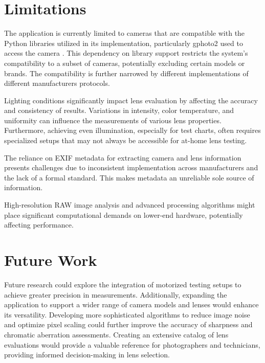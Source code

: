 \section{Limitations}
The application is currently limited to cameras that are compatible with the Python libraries utilized in its implementation, particularly gphoto2 used to access the camera \cite{gphoto2_compatible}. This dependency on library support restricts the system’s compatibility to a subset of cameras, potentially excluding certain models or brands. The compatibility is further narrowed by different implementations of different manufacturers protocols.

Lighting conditions significantly impact lens evaluation by affecting the accuracy and consistency of results. Variations in intensity, color temperature, and uniformity can influence the measurements of various lens properties. Furthermore, achieving even illumination, especially for test charts, often requires specialized setups that may not always be accessible for at-home lens testing.

The reliance on EXIF metadata for extracting camera and lens information presents challenges due to inconsistent implementation across manufacturers and the lack of a formal standard. This makes metadata an unreliable sole source of information.

High-resolution RAW image analysis and advanced processing algorithms might place significant computational demands on lower-end hardware, potentially affecting performance.

\section{Future Work}

Future research could explore the integration of motorized testing setups to achieve greater precision in measurements. Additionally, expanding the application to support a wider range of camera models and lenses would enhance its versatility. Developing more sophisticated algorithms to reduce image noise and optimize pixel scaling could further improve the accuracy of sharpness and chromatic aberration assessments. Creating an extensive catalog of lens evaluations would provide a valuable reference for photographers and technicians, providing informed decision-making in lens selection.

